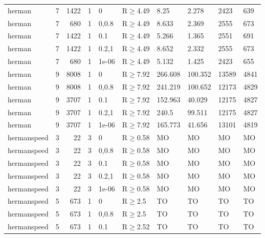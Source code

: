 \begin{longtable}{llrrllllll}
 herman        & 7        &   	1422 &   1 & 0     & R$\geq$4.49  & 8.25     & 2.278   & 2423    & 639     \\
 herman        & 7        &    	680 &   1 & 0,0.8 & R$\geq$4.49  & 8.633    & 2.369   & 2555    & 673     \\
 herman        & 7        &   	1422 &   1 & 0.1   & R$\geq$4.49  & 5.266    & 1.365   & 2551    & 691     \\
 herman        & 7        &   	1422 &   1 & 0.2,1 & R$\geq$4.49  & 8.652    & 2.332   & 2555    & 673     \\
 herman        & 7        &    	680 &   1 & 1e-06 & R$\geq$4.49  & 5.132    & 1.425   & 2423    & 655     \\
 herman        & 9        &   	8008 &   1 & 0     & R$\geq$7.92  & 266.608  & 100.352 & 13589   & 4841    \\
 herman        & 9        &   	8008 &   1 & 0,0.8 & R$\geq$7.92  & 241.219  & 100.652 & 12173   & 4829    \\
 herman        & 9        &   	3707 &   1 & 0.1   & R$\geq$7.92  & 152.963  & 40.029  & 12175   & 4827    \\
 herman        & 9        &   	3707 &   1 & 0.2,1 & R$\geq$7.92  & 240.5    & 99.511  & 12175   & 4827    \\
 herman        & 9        &   	3707 &   1 & 1e-06 & R$\geq$7.92  & 165.773  & 41.656  & 13101   & 4819    \\
 hermanspeed   & 3        &     	22 &   3 & 0     & R$\geq$0.58  & MO       & MO      & MO      & MO      \\
 hermanspeed   & 3        &     	22 &   3 & 0,0.8 & R$\geq$0.58  & MO       & MO      & MO      & MO      \\
 hermanspeed   & 3        &     	22 &   3 & 0.1   & R$\geq$0.58  & MO       & MO      & MO      & MO      \\
 hermanspeed   & 3        &     	22 &   3 & 0.2,1 & R$\geq$0.58  & MO       & MO      & MO      & MO      \\
 hermanspeed   & 3        &     	22 &   3 & 1e-06 & R$\geq$0.58  & MO       & MO      & MO      & MO      \\
 hermanspeed   & 5        &    	673 &   1 & 0     & R$\geq$2.5   & TO       & TO      & TO      & TO      \\
 hermanspeed   & 5        &    	673 &   1 & 0,0.8 & R$\geq$2.5   & TO       & TO      & TO      & TO      \\
 hermanspeed   & 5        &    	673 &   1 & 0.1   & R$\geq$2.52  & TO       & TO      & TO      & TO      \\

\end{longtable}

